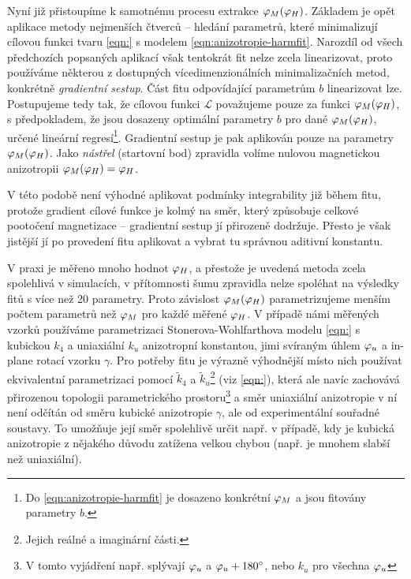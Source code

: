 Nyní již přistoupíme k samotnému procesu extrakce $\varphi_M(\varphi_H)$.
Základem je opět aplikace metody nejmenších čtverců -- hledání parametrů, které minimalizují cílovou funkci tvaru \eqref{eqn:} s modelem \eqref{eqn:anizotropie-harmfit}.
Narozdíl od všech předchozích popsaných aplikací však tentokrát fit nelze zcela linearizovat, proto používáme některou z dostupných vícedimenzionálních minimalizačních metod, konkrétně \emph{gradientní sestup}.
Část fitu odpovídající parametrům $b$ linearizovat lze.
Postupujeme tedy tak, že cílovou funkci $\mathcal{L}$ považujeme pouze za funkci $\varphi_M(\varphi_H)$, s předpokladem, že jsou dosazeny optimální parametry $b$ pro dané $\varphi_M(\varphi_H)$, určené lineární regresí\footnote{Do \eqref{eqn:anizotropie-harmfit} je dosazeno konkrétní $\varphi_M$ a jsou fitovány parametry $b$.}.
Gradientní sestup je pak aplikován pouze na parametry $\varphi_M(\varphi_H)$.
Jako \emph{nástřel} (startovní bod) zpravidla volíme nulovou magnetickou anizotropii $\varphi_M(\varphi_H)=\varphi_H$.

V této podobě není výhodné aplikovat podmínky integrability již během fitu, protože gradient cílové funkce je kolmý na směr, který způsobuje celkové pootočení magnetizace -- gradientní sestup jí přirozeně dodržuje.
Přesto je však jistější jí po provedení fitu aplikovat a vybrat tu správnou aditivní konstantu.

V praxi je měřeno mnoho hodnot $\varphi_H$, a přestože je uvedená metoda zcela spolehlivá v simulacích, v přítomnosti šumu zpravidla nelze spoléhat na výsledky fitů s více než 20 parametry.
Proto závislost $\varphi_M(\varphi_H)$ parametrizujeme menším počtem parametrů než $\varphi_M$ pro každé měřené $\varphi_H$.
V případě námi měřených vzorků používáme parametrizaci Stonerova-Wohlfarthova modelu \eqref{eqn:} s kubickou $k_4$ a uniaxiální $k_u$ anizotropní konstantou, jimi svíraným úhlem $\varphi_u$ a in-plane rotací vzorku $\gamma$.
Pro potřeby fitu je výrazně výhodnější místo nich používat ekvivalentní parametrizaci pomocí $\tilde{k}_4$ a $\tilde{k}_u$\footnote{Jejich reálné a imaginární části.} (viz \eqref{eqn:}), která ale navíc zachovává přirozenou topologii parametrického prostoru\footnote{V tomto vyjádření např. splývají $\varphi_u$ a $\varphi_u+\SI{180}{\degree}$, nebo $k_u$ pro všechna $\varphi_u$} a směr uniaxiální anizotropie v ní není odčítán od směru kubické anizotropie $\gamma$, ale od experimentální souřadné soustavy.
To umožňuje její směr spolehlivě určit např. v případě, kdy je kubická anizotropie z nějakého důvodu zatížena velkou chybou (např. je mnohem slabší než uniaxiální).

